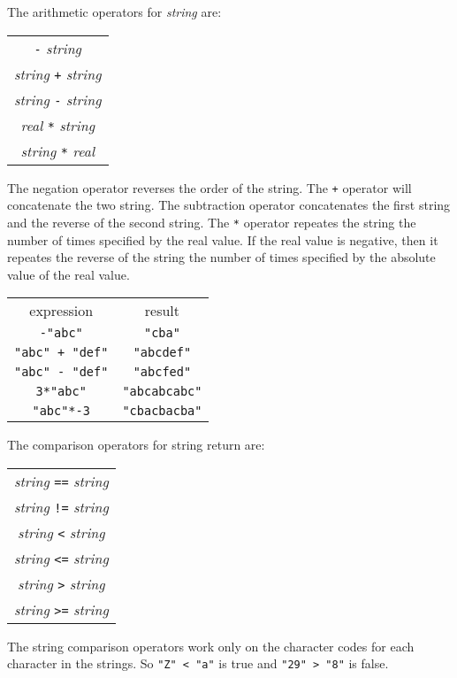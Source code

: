 \documentclass{article}
\begin{document}
The arithmetic operators for \emph{string} are:
\begin{center}
  \begin{tabular}{c}
    \verb|-| \emph{string} \\
    \emph{string} \verb|+| \emph{string} \\
    \emph{string} \verb|-| \emph{string} \\
    \emph{real} \verb|*| \emph{string} \\
    \emph{string} \verb|*| \emph{real} \\
  \end{tabular}
\end{center}
The negation operator reverses the order of the string.
The \verb|+| operator will concatenate the two string.
The subtraction operator concatenates the first string and the reverse of the second string.
The \verb|*| operator repeates the string the number of times specified by the real value.
If the real value is negative, then it repeates the reverse of the string the number of times
specified by the absolute value of the real value.
\begin{center}
  \begin{tabular}{cc}
    expression & result \\
    \verb|-"abc"| & \verb|"cba"| \\
    \verb|"abc" + "def"| & \verb|"abcdef"| \\
    \verb|"abc" - "def"| & \verb|"abcfed"| \\
    \verb|3*"abc"| & \verb|"abcabcabc"| \\
    \verb|"abc"*-3| & \verb|"cbacbacba"| \\
  \end{tabular}
\end{center}

The comparison operators for string return are:
\begin{center}
  \begin{tabular}{c}
    \emph{string} \verb|==| \emph{string} \\
    \emph{string} \verb|!=| \emph{string} \\
    \emph{string} \verb|<| \emph{string} \\
    \emph{string} \verb|<=| \emph{string} \\
    \emph{string} \verb|>| \emph{string} \\
    \emph{string} \verb|>=| \emph{string} \\
  \end{tabular}
\end{center}
The string comparison operators work only on the character codes for each character in the strings.
So \verb|"Z" < "a"| is true and \verb|"29" > "8"| is false. 
\end{document}
